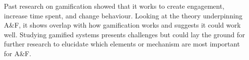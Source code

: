 Past research on gamification showed that it works to create engagement, increase time spent, and change behaviour. Looking at the theory underpinning A\&F, it shows overlap with how gamification works and suggests it could work well. Studying gamified systems presents challenges but could lay the ground for further research to elucidate which elements or mechanism are most important for A\&F.